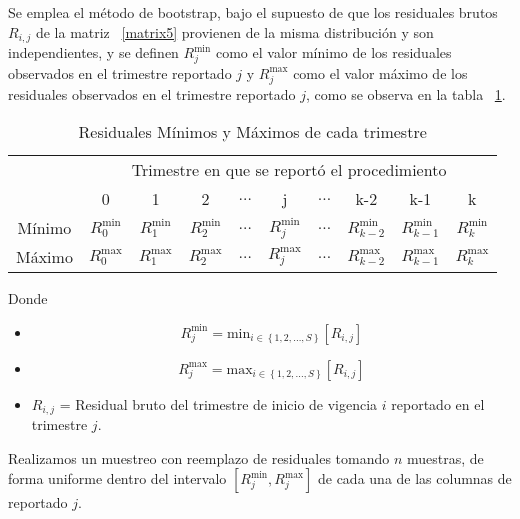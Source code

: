 \documentclass[11pt,twoside,openright,spanish]{report}
\numberwithin{equation}{chapter}
\numberwithin{figure}{chapter}
\numberwithin{table}{chapter}
\begin{document}
 
	Se emplea el método de bootstrap, bajo el supuesto de que los residuales brutos $R_{i,j}$ de la matriz ~\ref{matrix5} provienen de la misma distribución y son independientes, y se definen $R_{j}^{\text{min}}$ como el valor mínimo de los residuales observados en el trimestre reportado $j$ y $R_{j}^{\text{max}}$ como el valor máximo de los residuales observados en el trimestre reportado $j$, como se observa en la tabla ~\ref{matrix6}.
	
	\begin{table}[ht]
		\centering
		\begin{tabularx}{\linewidth}{ c|ccccccccc}
			& \multicolumn{9}{c}{Trimestre en que se reportó el procedimiento} \\
			& 0  & 1 & 2 & $ \dots $ & j & $\dots $ & k-2 & k-1 &  k\\
			\midrule
			Mínimo      &  $R_{0}^{\text{min}}$ & $R_{1}^{\text{min}}$ & $R_{2}^{\text{min}}$ & $ \dots $ & $R_{j}^{\text{min}}$ & $ \dots $ & $R_{k-2}^{\text{min}}$ & $R_{k-1}^{\text{min}}$ & $R_{k}^{\text{min}}$ \\
			Máximo      &  $R_{0}^{\text{max}}$ & $R_{1}^{\text{max}}$ & $R_{2}^{\text{max}}$ & $ \dots $ & $R_{j}^{\text{max}}$ & $ \dots $ & $R_{k-2}^{\text{max}}$ & $R_{k-1}^{\text{max}}$ & $R_{k}^{\text{max}}$ \\
		\end{tabularx}
	\caption{Residuales Mínimos y Máximos de cada trimestre}
	\label{matrix6}
	\end{table}
	
Donde

\begin{itemize}
	
	\setlength\itemsep{-0.5em}
	
	\item $$R_{j}^{\text{min}}= \text{min}_{ i\in \left\{1,2,\dots ,S\right\}} \left[R_{i,j}^{}\right]$$	
	
	\item $$R_{j}^{\text{max}}= \text{max}_{ i\in \left\{1,2,\dots ,S\right\}} \left[R_{i,j}^{}\right]$$
	
	\item $R_{i,j}$ = Residual bruto del trimestre de inicio de vigencia $i$ reportado en el trimestre $j$.
		
\end{itemize} 

	Realizamos un muestreo con reemplazo de residuales tomando $n$ muestras, de forma uniforme dentro del intervalo $\left[R_{j}^{\text{min}},R_{j}^{\text{max}}\right]$ de cada una de las columnas de reportado $j$.
	
\end{document}
